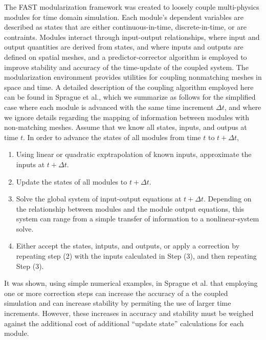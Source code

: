 \documentclass{aiaa-tc}
\begin{document}
The FAST modularization framework\cite{Jonkman:2013,Sprague:2014,Sprague:FAST2015} was created to loosely couple multi-physics modules for time domain simulation.  
Each module's dependent variables are described as states that are either continuous-in-time, discrete-in-time, or are contraints.  
Modules interact through input-output relationships, where input and output quantities are derived from states, and where inputs and outputs are defined on spatial meshes, and a predictor-corrector algorithm is employed to improve stability and accuracy of the time-update of the coupled system.    
The modularization environment provides utilities for coupling nonmatching meshes in space and time.
A detailed description of the coupling algorithm employed here can be found in Sprague et al.\cite{Sprague:FAST2015}, which we summarize as follows for the simplified case where each module is advanced with the same time increment $\Delta t$, and where we ignore details regarding the mapping of information between modules with non-matching meshes.   
Assume that we know all states, inputs, and outpus at time $t$.  In order to advance the states of all modules from time $t$ to $t+ \Delta t$, 
\begin{enumerate}

\item Using linear or quadratic exptrapolation of known inputs, approximate the inputs at $t+\Delta t$.  

\item Update the states of all modules to $t + \Delta t$.  

\item Solve the global system of input-output equations at $t + \Delta t$.  Depending on the relationship between modules and the module output equations, this system can range from a simple transfer of information to a nonlinear-system solve.  

\item Either accept the states, intputs, and outputs, or apply a correction by repeating step (2) with the inputs calculated in Step (3), and then repeating Step (3).

\end{enumerate}
It was shown, using simple numerical examples, in Sprague et al.\cite{Sprague:2014,Sprague:FAST2015} that employing one or more correction steps can increase the accuracy of a the coupled simulation and can increase stability by permiting the use of larger time increments.  However, these increases in accuracy and stability must be weighed against the additional cost of additional ``update state'' calculations for each module.
\end{document}

